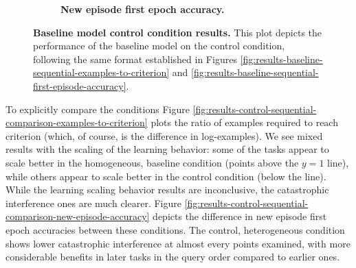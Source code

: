 \begin{figure}[!htb]
\begin{subfigure}{.49\textwidth}
    \caption{ {\bf New episode first epoch accuracy.}}
    \label{fig:results-control-sequential-first-episode-accuracy}
\end{subfigure}
\caption[Baseline model control condition results.]{{\bf Baseline model control condition results.} This plot depicts the performance of the baseline model on the control condition, following the same format established in Figures \ref{fig:results-baseline-sequential-examples-to-criterion} and \ref{fig:results-baseline-sequential-first-episode-accuracy}.}
\label{fig:results-control-absolute}
\vspace{-0.2in}
\end{figure}

To explicitly compare the conditions Figure \ref{fig:results-control-sequential-comparison-examples-to-criterion} plots the ratio of examples required to reach criterion (which, of course, is the difference in log-examples). We see mixed results with the scaling of the learning behavior: some of the tasks appear to scale better in the homogeneous, baseline condition (points above the $y=1$ line), while others appear to scale better in the control condition (below the line). While the learning scaling behavior results are inconclusive, the catastrophic interference ones are much clearer. Figure \ref{fig:results-control-sequential-comparison-new-episode-accuracy} depicts the difference in new episode first epoch accuracies between these conditions. The control, heterogeneous condition shows lower catastrophic interference at almost every points examined, with more considerable benefits in later tasks in the query order compared to earlier ones.  

